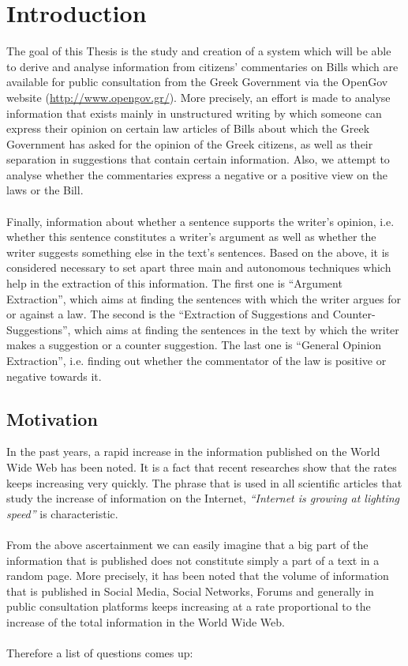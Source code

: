 \chapter{Introduction}
The goal of this Thesis is the study and creation of a system which will be able to derive and analyse information from citizens' commentaries on Bills which are available for public consultation from the Greek Government via the OpenGov website (\url{http://www.opengov.gr/}). More precisely, an effort is made to analyse information that exists mainly in unstructured writing by which someone can express their opinion on certain law articles of Bills about which the Greek Government has asked for the opinion of the Greek citizens, as well as their separation in suggestions that contain certain information. Also, we attempt to analyse whether the commentaries express a negative or a positive view on the laws or the Bill.\\
\\
Finally, information about whether a sentence supports the writer's opinion, i.e. whether this sentence constitutes a writer's argument as well as whether the writer suggests something else in the text's sentences. Based on the above, it is considered necessary to set apart three main and autonomous techniques which help in the extraction of this information. The first one is ``Argument Extraction'', which aims at finding the sentences with which the writer argues for or against a law. The second is the ``Extraction of  Suggestions and Counter-Suggestions'', which aims at finding the sentences in the text by which the writer makes a suggestion or a counter suggestion. The last one is ``General Opinion Extraction'', i.e. finding out whether the commentator of the law is positive or negative towards it.

\section{Motivation}
In the past years, a rapid increase in the information published on the World Wide Web has been noted. It is a fact that recent researches show that the rates keeps increasing very quickly. The phrase that is used in all scientific articles that study the increase of information on the Internet, \textit{``Internet is growing at lighting speed''} is characteristic.\\
\\
From the above ascertainment we can easily imagine that a big part of the information that is published does not constitute simply a part of a text in a random page. More precisely, it has been noted that the volume of information that is published in Social Media, Social Networks, Forums and generally in public consultation platforms keeps increasing at a rate proportional to  the increase of the total information in the World Wide Web.\\
\\
Therefore a list of questions comes up:\\

